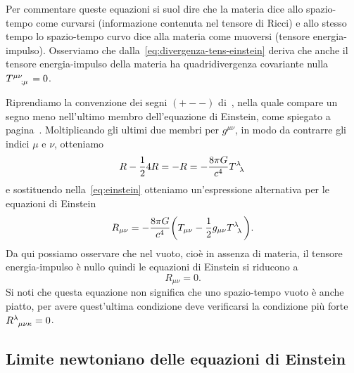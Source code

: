 Per commentare queste equazioni si suol dire che la materia dice allo
spazio-tempo come curvarsi (informazione contenuta nel tensore di Ricci) e allo
stesso tempo lo spazio-tempo curvo dice alla materia come muoversi (tensore
energia-impulso).  Osserviamo che dalla~\eqref{eq:divergenza-tens-einstein}
deriva che anche il tensore energia-impulso della materia ha quadridivergenza
covariante nulla $\tensor{T}{^{\mu\nu}_{;\mu}} = 0$.

Riprendiamo la convenzione dei segni $(+--)$ di~\textcite{weinberg:gravitation},
nella quale compare un segno meno nell'ultimo membro dell'equazione di Einstein,
come spiegato a pagina~\pageref{eq:convenzione-segni}.  Moltiplicando gli ultimi
due membri per $g^{\mu\nu}$, in modo da contrarre gli indici $\mu$ e $\nu$,
otteniamo
\begin{equation}
  R - \frac{1}{2}4R = -R = -\frac{8\pi G}{c^{4}}\tensor{T}{^{\lambda}_{\lambda}}
\end{equation}
e sostituendo nella~\eqref{eq:einstein} otteniamo un'espressione alternativa per
le equazioni di Einstein
\begin{equation}
  R_{\mu\nu} = -\frac{8\pi G}{c^{4}} \bigg( T_{\mu\nu} -
  \frac{1}{2}g_{\mu\nu}\tensor{T}{^{\lambda}_{\lambda}} \bigg).
\end{equation}
Da qui possiamo osservare che nel vuoto, cioè in assenza di materia, il tensore
energia-impulso è nullo quindi le equazioni di
Einstein si riducono a
\begin{equation}
  R_{\mu\nu} = 0.
\end{equation}
Si noti che questa equazione non significa che uno spazio-tempo vuoto è anche
piatto, per avere quest'ultima condizione deve verificarsi la condizione più
forte $\tensor{R}{^{\lambda}_{\mu\nu\kappa}} = 0$.

\subsection{Limite newtoniano delle equazioni di Einstein}
\label{sec:limite-newtoniano-einstein}

